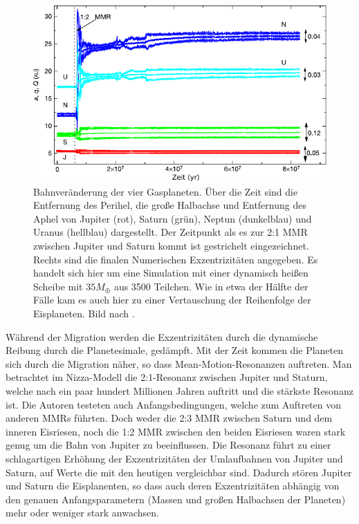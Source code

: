 \documentclass[12pt,a4paper,twoside]{article}
\begin{document}
\begin{figure}[tbn]
\centering
\includegraphics[scale=1]{img/Tsiganis2005-1.pdf}
\caption{Bahnveränderung der vier Gasplaneten. Über die Zeit sind die Entfernung des Perihel, die große Halbachse und Entfernung des Aphel von Jupiter (rot), Saturn (grün), Neptun (dunkelblau) und Uranus (hellblau) dargestellt. Der Zeitpunkt als es zur 2:1 MMR zwischen Jupiter und Saturn kommt ist gestrichelt eingezeichnet. Rechts sind die finalen Numerischen Exzentrizitäten angegeben. Es handelt sich hier um eine Simulation mit einer dynamisch heißen Scheibe mit $35M_\oplus$ aus 3500 Teilchen. Wie in etwa der Hälfte der Fälle kam es auch hier zu einer Vertauschung der Reihenfolge der Eisplaneten. Bild nach \cite{Tsiganis2005}.}
\label{fig:Orbitalevolution}
\end{figure}
Während der Migration werden die Exzentrizitäten durch die dynamische Reibung durch die Planetesimale, gedämpft\cite{Tsiganis2005}.
Mit der Zeit kommen die Planeten sich durch die Migration näher, so dass Mean-Motion-Resonanzen auftreten.
Man betrachtet im Nizza-Modell die 2:1-Resonanz zwischen Jupiter und Staturn, welche nach ein paar hundert Millionen Jahren auftritt und die stärkste Resonanz ist. %
Die Autoren testeten auch Anfangsbedingungen, welche zum Auftreten von anderen MMRs führten. Doch weder die 2:3 MMR zwischen Saturn und dem inneren Eisriesen, noch die 1:2 MMR zwischen den beiden Eisriesen waren stark genug um die Bahn von Jupiter zu beeinflussen\cite{Tsiganis2005}. %
Die Resonanz führt zu einer schlagartigen Erhöhung der Exzentrizitäten der Umlaufbahnen von Jupiter und Saturn, auf Werte die mit den heutigen vergleichbar sind. %
Dadurch stören Jupiter und Saturn die Eisplanenten, so dass auch deren Exzentrizitäten abhängig von den genauen Anfangsparametern (Massen und großen Halbachsen der Planeten) mehr oder weniger stark anwachsen\cite{Tsiganis2005}.
\end{document}
